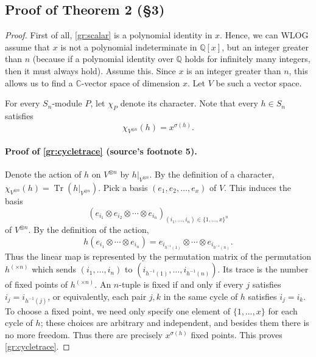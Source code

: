 \documentclass[UTF8,11pt,a4paper]{ctexart}
\theoremstyle{definition}\newtheorem*{definition}{Definition}
\theoremstyle{remark}\newtheorem*{remark}{Remark}
\DeclareMathOperator{\Tr}{Tr}
\newcommand{\C}{\mathbb C}
\newcommand{\Q}{\mathbb Q}
\begin{document}
\subsection*{Proof of Theorem 2 (\S3)}
\begin{proof}
First of all, \eqref{gr:scalar} is a polynomial identity in $x$. Hence, we can WLOG assume that $x$ is not a polynomial indeterminate in $\Q[x]$, but an integer greater than $n$ (because if a polynomial identity over $\Q$ holds for infinitely many integers, then it must always hold). Assume this. Since $x$ is an integer greater than $n$, this allows us to find a $\C$-vector space of dimension $x$. Let $V$ be such a vector space.

For every $S_n$-module $P$, let $\chi_P$ denote its character. Note that every $h\in S_n$ satisfies
\begin{equation}\label{gr:cycletrace}
\chi_{V^{\otimes n}}(h)=x^{\sigma(h)}.
\end{equation}
\paragraph{Proof of \eqref{gr:cycletrace} (source's footnote 5).}
Denote the action of $h$ on $V^{\otimes n}$ by $h|_{V^{\otimes n}}$. By the definition of a character, $\chi_{V^{\otimes n}}(h)=\Tr(h|_{V^{\otimes n}})$.
Pick a basis $(e_1,e_2,\ldots,e_x)$ of $V$. This induces the basis
\[
(e_{i_1}\otimes e_{i_2}\otimes\cdots\otimes e_{i_n})_{(i_1,\ldots,i_n)\in\{1,\ldots,x\}^n}
\]
of $V^{\otimes n}$. By the definition of the action,
\[
h(e_{i_1}\otimes\cdots\otimes e_{i_n})
=e_{i_{h^{-1}(1)}}\otimes\cdots\otimes e_{i_{h^{-1}(n)}}.
\]
Thus the linear map is represented by the permutation matrix of the permutation $h^{(\times n)}$ which sends $(i_1,\ldots,i_n)$ to $(i_{h^{-1}(1)},\ldots,i_{h^{-1}(n)})$. Its trace is the number of fixed points of $h^{(\times n)}$.
An $n$-tuple is fixed if and only if every $j$ satisfies $i_j=i_{h^{-1}(j)}$, or equivalently, each pair $j,k$ in the same cycle of $h$ satisfies $i_j=i_k$. To choose a fixed point, we need only specify one element of $\{1,\ldots,x\}$ for each cycle of $h$; these choices are arbitrary and independent, and besides them there is no more freedom. Thus there are precisely $x^{\sigma(h)}$ fixed points. This proves \eqref{gr:cycletrace}.


\end{proof}
\end{document}
